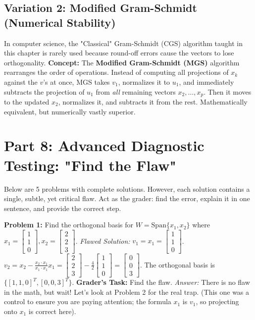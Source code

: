 \documentclass[11pt, letterpaper]{article}
\theoremstyle{definition}
\theoremstyle{remark}
\begin{document}
\subsection{Variation 2: Modified Gram-Schmidt (Numerical Stability)}
In computer science, the "Classical" Gram-Schmidt (CGS) algorithm taught in this chapter is rarely used because round-off errors cause the vectors to lose orthogonality. 
\textbf{Concept:} The \textbf{Modified Gram-Schmidt (MGS)} algorithm rearranges the order of operations. Instead of computing all projections of $x_k$ against the $v$'s at once, MGS takes $v_1$, normalizes it to $u_1$, and immediately subtracts the projection of $u_1$ from \textit{all} remaining vectors $x_2, \dots, x_p$. Then it moves to the updated $x_2$, normalizes it, and subtracts it from the rest. Mathematically equivalent, but numerically vastly superior.

\newpage
\section{Part 8: Advanced Diagnostic Testing: "Find the Flaw"}

Below are 5 problems with complete solutions. However, each solution contains a single, subtle, yet critical flaw. Act as the grader: find the error, explain it in one sentence, and provide the correct step.

\textbf{Problem 1:} Find the orthogonal basis for $W = \text{Span}\{x_1, x_2\}$ where $x_1 = \begin{bmatrix} 1 \\ 1 \\ 0 \end{bmatrix}, x_2 = \begin{bmatrix} 2 \\ 2 \\ 3 \end{bmatrix}$.
\textit{Flawed Solution:}
$v_1 = x_1 = \begin{bmatrix} 1 \\ 1 \\ 0 \end{bmatrix}$.
$v_2 = x_2 - \frac{x_2 \cdot x_1}{x_1 \cdot x_1}x_1 = \begin{bmatrix} 2 \\ 2 \\ 3 \end{bmatrix} - \frac{4}{2}\begin{bmatrix} 1 \\ 1 \\ 0 \end{bmatrix} = \begin{bmatrix} 0 \\ 0 \\ 3 \end{bmatrix}$.
The orthogonal basis is $\{[1, 1, 0]^T, [0, 0, 3]^T\}$.
\textbf{Grader's Task:} Find the flaw.
\textit{Answer:} There is no flaw in the math, but wait! Let's look at Problem 2 for the real trap. (This one was a control to ensure you are paying attention; the formula $x_1$ is $v_1$, so projecting onto $x_1$ is correct here).
\end{document}
